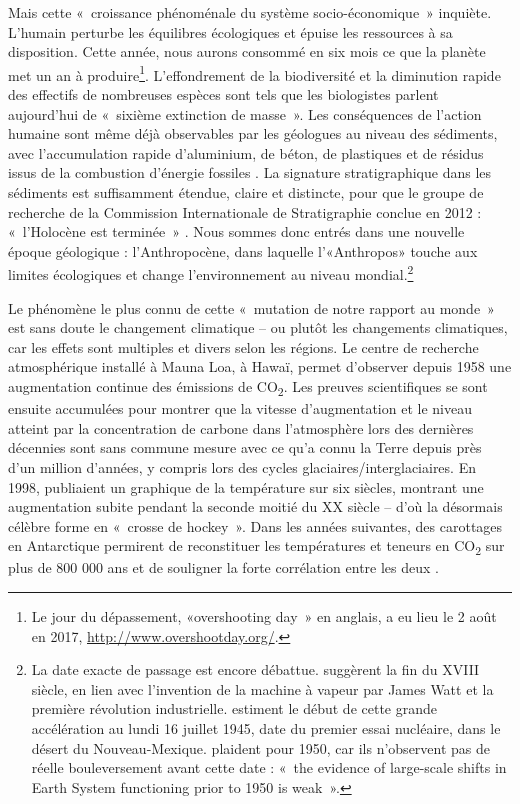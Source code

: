 Mais cette «~croissance phénoménale du système socio-économique~» \citep{Steffen2004} inquiète. L’humain perturbe les équilibres écologiques et épuise les ressources à sa disposition. Cette année, nous aurons consommé en six mois ce que la planète met un an à produire\footnote{Le jour du dépassement, «overshooting day~» en anglais, a eu lieu le 2 août en 2017, \url{http://www.overshootday.org/}.}. L’effondrement de la biodiversité et la diminution rapide des effectifs de nombreuses espèces sont tels que les biologistes parlent aujourd’hui de «~sixième extinction de masse~». Les conséquences de l'action humaine sont même déjà observables par les géologues au niveau des sédiments, avec l'accumulation rapide d'aluminium, de béton, de plastiques et de résidus issus de la combustion d'énergie fossiles \citep{Waters2016}. La signature stratigraphique dans les sédiments est suffisamment étendue, claire et distincte, pour que le groupe de recherche de la Commission Internationale de Stratigraphie conclue en 2012 : «~l'Holocène est terminée~» \citep{Latour2014}. Nous sommes donc entrés dans une nouvelle époque géologique : l'Anthropocène, dans laquelle l'«Anthropos» touche aux limites écologiques et change l'environnement au niveau mondial.\footnote{La date exacte de passage est encore débattue. \citet{Crutzen2000} suggèrent la fin du XVIII siècle, en lien avec l'invention de la machine à vapeur par James Watt et la première révolution industrielle. \citet{Zalasiewicz2014} estiment le début de cette grande accélération au lundi 16 juillet 1945, date du premier essai nucléaire, dans le désert du Nouveau-Mexique. \citet{Steffen2015} plaident pour 1950, car ils n'observent pas de réelle bouleversement avant cette date : «~the evidence of large-scale shifts in Earth System functioning prior to 1950 is weak~».}

Le phénomène le plus connu de cette «~mutation de notre rapport au monde~» \citep{Latour2015} est sans doute le changement climatique -- ou plutôt les changements climatiques, car les effets sont multiples et divers selon les régions.
Le centre de recherche atmosphérique installé à Mauna Loa, à Hawaï, permet d'observer depuis 1958 une augmentation continue des émissions de CO\textsubscript{2}. Les preuves scientifiques se sont ensuite accumulées pour montrer que la vitesse d'augmentation et le niveau atteint par la concentration de carbone dans l'atmosphère lors des dernières décennies sont sans commune mesure avec ce qu'a connu la Terre depuis près d'un million d'années, y compris lors des cycles glaciaires/interglaciaires. En 1998, \citet{Mann1998} publiaient un graphique de la température sur six siècles, montrant une augmentation subite pendant la seconde moitié du XX siècle -- d'où la désormais célèbre forme en «~crosse de hockey~». 
Dans les années suivantes, des carottages en Antarctique permirent de reconstituer les températures et teneurs en CO\textsubscript{2} sur plus de 800 000 ans et de souligner la forte corrélation entre les deux \citep{Petit1999,Luthi2008}.

